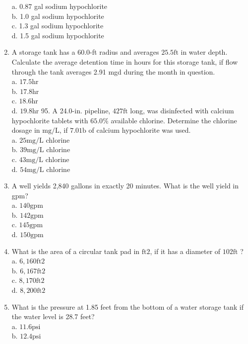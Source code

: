 \begin{enumerate}
a. 0.87 gal sodium hypochlorite\\
b. 1.0 gal sodium hypochlorite\\
c. 1.3 gal sodium hypochlorite\\
d. 1.5 gal sodium hypochlorite\\
\item A storage tank has a 60.0-ft radius and averages $25.5 \mathrm{ft}$ in water depth. Calculate the average detention time in hours for this storage tank, if flow through the tank averages 2.91 mgd during the month in question.\\
a. $17.5 \mathrm{hr}$\\
b. $17.8 \mathrm{hr}$\\
c. $18.6 \mathrm{hr}$\\
d. $19.8 \mathrm{hr}$ 95. A 24.0-in. pipeline, $427 \mathrm{ft}$ long, was disinfected with calcium hypochlorite tablets with $65.0 \%$ available chlorine. Determine the chlorine dosage in $\mathrm{mg} / \mathrm{L}$, if $7.0 \mathrm{1b}$ of calcium hypochlorite was used.\\
a. $25 \mathrm{mg} / \mathrm{L}$ chlorine\\
b. $39 \mathrm{mg} / \mathrm{L}$ chlorine\\
c. $43 \mathrm{mg} / \mathrm{L}$ chlorine\\
d. $54 \mathrm{mg} / \mathrm{L}$ chlorine\\
\item A well yields 2,840 gallons in exactly 20 minutes. What is the well yield in gpm?\\
a. $140 \mathrm{gpm}$\\
b. $142 \mathrm{gpm}$\\
c. $145 \mathrm{gpm}$\\
d. $150 \mathrm{gpm}$\\
\item What is the area of a circular tank pad in $\mathrm{ft} 2$, if it has a diameter of $102 \mathrm{ft}$ ?\\
a. $6,160 \mathrm{ft} 2$\\
b. $6,167 \mathrm{ft} 2$\\
c. $8,170 \mathrm{ft} 2$\\
d. $8,200 \mathrm{ft} 2$\\
\item What is the pressure at 1.85 feet from the bottom of a water storage tank if the water level is 28.7 feet?\\
a. $11.6 \mathrm{psi}$\\
b. $12.4 \mathrm{psi}$\\

\end{enumerate}
